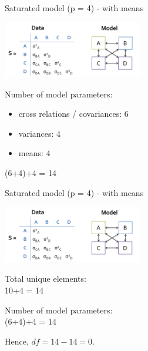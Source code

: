 \documentclass[10pt]{beamer}\usepackage[]{graphicx}\usepackage[]{xcolor}
\begin{document}
%
\begin{frame}{Saturated model (p = 4) - with means}

\includegraphics[height=2.5cm,keepaspectratio=T] {saturated4.png}

\vspace{5mm}

Number of model parameters: 
\begin{itemize}
\item{cross relations / covariances: 6}
\item{variances: 4}
\item{means: 4}
\end{itemize}
(6+4)+4 = 14

\end{frame}
%
\begin{frame}{Saturated model (p = 4) - with means}

\includegraphics[height=2.5cm,keepaspectratio=T] {saturated4.png}

\vspace{5mm}

Total unique elements:\\
10+4 = 14

\vspace{5mm}

Number of model parameters:\\
(6+4)+4 = 14

\vspace{5mm}

Hence, $df = 14-14 = 0$.

\end{frame}
%
\end{document}
